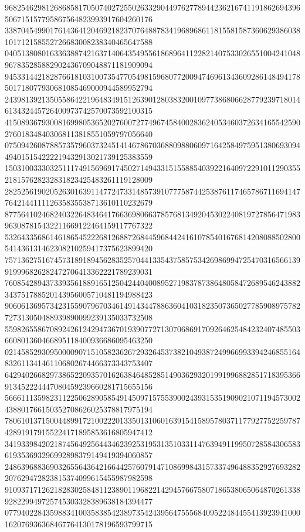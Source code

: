\begin{DoxyCode}
      968254629812686858170507402725502633290449762778944236216741191862694396506715157795867564823993917604260176
      338704549901761436412046921823707648878341968968611815581587360629386038101712158552726683008238340465647588
      040513808016336388742163714064354955618689641122821407533026551004241048967835285882902436709048871181909094
      945331442182876618103100735477054981596807720094746961343609286148494178501718077930681085469000944589952794
      243981392135055864221964834915126390128038320010977386806628779239718014613432445726400973742570073592100315
      415089367930081699805365202760072774967458400283624053460372634165542590276018348403068113818551059797056640
      075094260878857357960373245141467867036880988060971642584975951380693094494015154222219432913021739125383559
      150310033303251117491569691745027149433151558854039221640972291011290355218157628232831823425483261119128009
      282525619020526301639114772473314857391077758744253876117465786711694147764214411112635835538713610110232679
      877564102468240322648346417663698066378576813492045302240819727856471983963087815432211669122464159117767322
      532643356861461865452226812688726844596844241610785401676814208088502800541436131462308210259417375623899420
      757136275167457318918945628352570441335437585753426986994725470316566139919996826282472706413362221789239031
      760854289437339356188916512504244040089527198378738648058472689546243882343751788520143956005710481194988423
      906061369573423155907967034614914344788636041031823507365027785908975782727313050488939890099239135033732508
      559826558670892426124294736701939077271307068691709264625484232407485503660801360466895118400936686095463250
      021458529309500009071510582362672932645373821049387249966993394246855164832611341461106802674466373343753407
      642940266829738652209357016263846485285149036293201991996882851718395366913452224447080459239660281715655156
      566611135982311225062890585491450971575539002439315351909021071194573002438801766150352708626025378817975194
      780610137150044899172100222013350131060163915415895780371177927752259787428919179155224171895853616805947412
      341933984202187456492564434623925319531351033114763949119950728584306583619353693296992898379149419394060857
      248639688369032655643642166442576079147108699843157337496488352927693282207629472823815374099615455987982598
      910937171262182830258481123890119682214294576675807186538065064870261338928229949725745303328389638184394477
      077940228435988341003583854238973542439564755568409522484455413923941000162076936368467764130178196593799715

\end{DoxyCode}

